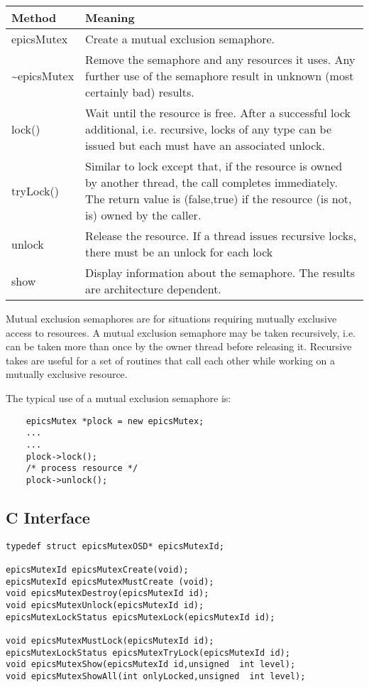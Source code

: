 \begin{center}
\begin{longtable}{p{1.38889in}p{5.0in}}
\textbf{Method} & \textbf{Meaning}\\
\hline
epicsMutex & Create a mutual exclusion semaphore.\\
\~{}epicsMutex & Remove the semaphore and any resources it uses. Any further use of the semaphore result in unknown (most certainly bad) results.\\
lock() & Wait until the resource is free. After a successful lock additional, i.e. recursive, locks of any type can be issued but each must have an associated unlock.\\
tryLock() & Similar to lock except that, if the resource is owned by another thread, the call completes immediately. The return value is (false,true) if the resource (is not, is) owned by the caller.\\
unlock & Release the resource. If a thread issues recursive locks, there must be an unlock for each lock\\
show & Display information about the semaphore. The results are architecture dependent.
\end{longtable}

\end{center}


Mutual exclusion semaphores are for situations requiring mutually exclusive access to resources. A mutual exclusion 
semaphore may be taken recursively, i.e. can be taken more than once by the owner thread before releasing it. Recursive 
takes are useful for a set of routines that call each other while working on a mutually exclusive resource.

The typical use of a mutual exclusion semaphore is:

\begin{verbatim}
    epicsMutex *plock = new epicsMutex;
    ...
    ...
    plock->lock();
    /* process resource */
    plock->unlock();
\end{verbatim}

\subsection{C Interface}

\begin{verbatim}
typedef struct epicsMutexOSD* epicsMutexId;

epicsMutexId epicsMutexCreate(void);
epicsMutexId epicsMutexMustCreate (void);
void epicsMutexDestroy(epicsMutexId id);
void epicsMutexUnlock(epicsMutexId id);
epicsMutexLockStatus epicsMutexLock(epicsMutexId id);

void epicsMutexMustLock(epicsMutexId id);
epicsMutexLockStatus epicsMutexTryLock(epicsMutexId id);
void epicsMutexShow(epicsMutexId id,unsigned  int level);
void epicsMutexShowAll(int onlyLocked,unsigned  int level);
\end{verbatim}

